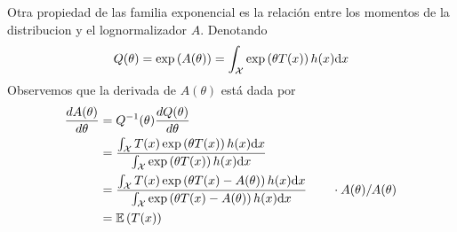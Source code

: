 Otra propiedad de las familia exponencial es la relación entre los momentos de la distribucion y el lognormalizador $A$. Denotando
\begin{equation}
	Q(\theta) =\exp\left(A(\theta)\right) = \int_{\mathcal X} \exp\left(\theta T (x)\right)h(x){\text{d}x}
\end{equation}
Observemos que la derivada de $A(\theta)$ está dada por 
\begin{align}
	\frac{dA(\theta)}{d\theta} &= Q^{-1}(\theta)\frac{d Q(\theta)}{d\theta} \\ 
	&= \frac{\int_{\mathcal X} T (x) \exp\left(\theta T (x)\right)h(x){\text{d}x}}{\int_{\mathcal X} \exp\left(\theta T (x)\right)h(x){\text{d}x}} \nonumber\\
	&= \frac{\int_{\mathcal X} T (x) \exp\left(\theta T (x) -A(\theta)\right)h(x){\text{d}x}}{\int_{\mathcal X} \exp\left(\theta T (x)-A(\theta) \right)h(x){\text{d}x}} \quad\quad \cdot  A(\theta)/A(\theta) \nonumber\\
	&=\mathbb{E} \left(T(x)\right)  \nonumber
\end{align}

